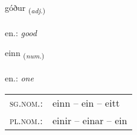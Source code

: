 \documentclass[frontgrid, backgrid]{flacards}\usepackage[]{graphicx}\usepackage[]{xcolor}
\begin{document}
\renewcommand{\flhead}{\vskip5pt \fboxsep=0pt {\small\bfseries\footnotesize Lýsingarorð | Adjective}}
\renewcommand{\fcfoot}{\vskip5pt \fboxsep=0pt \hspace{2pt}{\small\bfseries\footnotesize 1K}}

\renewcommand{\blhead}{\vskip5pt {\small\bfseries\footnotesize Lýsingarorð | Adjective }}
\renewcommand{\bcfoot}{\vskip5pt \hspace{2pt}{\small\bfseries\footnotesize 1K}}


{góður \small{\textsubscript{(\textit{adj.})}} \\[1ex] %
\textphonetic{[kouːðʏr]} \\
en.: \emph{good} \\  [2ex]
\renewcommand*{\arraystretch}{0.8}
}

\renewcommand{\flhead}{\vskip5pt \fboxsep=0pt {\small\bfseries\footnotesize Töluorð | Numeral}}
\renewcommand{\fcfoot}{\vskip5pt \fboxsep=0pt \hspace{2pt}{\small\bfseries\footnotesize 1K}}

\renewcommand{\blhead}{\vskip5pt {\small\bfseries\footnotesize Töluorð | Numeral }}
\renewcommand{\bcfoot}{\vskip5pt \hspace{2pt}{\small\bfseries\footnotesize 1K}}


{einn \small{\textsubscript{(\textit{num.})}} \\[1ex] %
\textphonetic{[eitn̥]} \\
en.: \emph{one} \\  [2ex]
\renewcommand*{\arraystretch}{0.8}
\begin{tabular}{ll}
\textsc{sg.nom.}: & einn  --  ein -- eitt \\ 
\textsc{pl.nom.}: & einir -- einar -- ein
\end{tabular}
}
\end{document}

